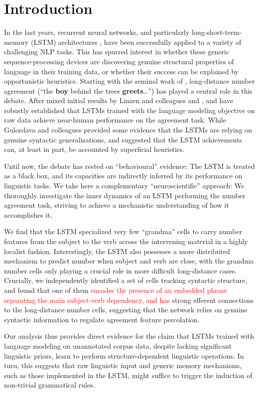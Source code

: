 \section{Introduction}

In the last years, recurrent neural networks, and particularly
long-short-term-memory (LSTM) architectures
\cite{Hochreiter:Schmidhuber:1997}, have been successfully applied to
a variety of challenging NLP tasks. This has spurred interest in
whether these generic sequence-processing devices are discovering
genuine structural properties of language in their training data, or
whether their success can be explained by opportunistic
heuristics. Starting with the seminal work of
, long-distance number agreement (``the
\textbf{boy} behind the trees \textbf{greets}\ldots'') has played a
central role in this debate. After mixed initial results by Linzen and
colleagues and ,
 and  have
robustly established that LSTMs trained with the language modeling
objective on raw data achieve near-human performance on the
agreement task. While Gulordava and colleagues provided some evidence that the
LSTMs are relying on genuine syntactic generalizations,
 and 
suggested that the LSTM achievements can, at least in part, be
accounted by superficial heuristics.

Until now, the debate has rested on ``behavioural'' evidence: The
LSTM is treated as a black box, and its capacities are indirectly
inferred by its performance on linguistic tasks. We take here a
complementary ``neuroscientific'' approach: We thoroughly investigate
the inner dynamics of an LSTM performing the number agreement task,
striving to achieve a mechanistic understanding of how it accomplishes
it.

We find that the LSTM specialized very few ``grandma'' cells
\cite{Bowers:2009} to carry number features from the subject to the
verb across the intervening material in a highly localist
fashion. Interestingly, the LSTM also possesses a more distributed
mechanism to predict number when subject and verb are close, with the
grandma number cells only playing a crucial role in more difficult
long-distance cases. Crucially, we independently identified a set of
cells tracking syntactic structure, and found that one of them \textcolor{red}{encodes the presence of an embedded phrase separating the main subject-verb dependency, and has} strong efferent connections to the long-distance number cells,
suggesting that the network relies on genuine syntactic information to
regulate agreement feature percolation.

Our analysis thus provides direct evidence for the claim that LSTMs
trained with language modeling on unannotated corpus data, despite
lacking significant linguistic priors, learn to perform
structure-dependent linguistic operations. In turn, this suggests that
raw linguistic input and generic memory mechanisms, such as those
implemented in the LSTM, might suffice to trigger the induction of
non-trivial grammatical rules.
